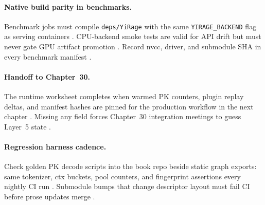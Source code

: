 \paragraph{Native build parity in benchmarks.} Benchmark jobs must compile \texttt{deps/YiRage} with the same \texttt{YIRAGE\_BACKEND} flag as serving containers \citep{yirage2026,chen2020compilerbasedhardw,patel2025llminference,taxbreak2026,memoryfloor2026,kwon2023vllm,liu2024deepseekv3,nvidia2024cudagraphs,dao2022flashattention,amd2024xdna,amd2024aie,dao2023flashdecoding,nvidia2022hopper,semianalysis2024tma,dlbook}. CPU-backend smoke tests are valid for API drift but must never gate GPU artifact promotion \citep{yirage2026,chen2020compilerbasedhardw,patel2025llminference,amd2024aie,amd2024xdna,taxbreak2026,memoryfloor2026,kwon2023vllm,liu2024deepseekv3,nvidia2024cudagraphs,dao2022flashattention,dao2023flashdecoding,nvidia2022hopper,semianalysis2024tma,dlbook}. Record nvcc, driver, and submodule SHA in every benchmark manifest \citep{yirage2026,chen2020compilerbasedhardw,patel2025llminference,dlbook,taxbreak2026,memoryfloor2026,kwon2023vllm,liu2024deepseekv3,nvidia2024cudagraphs,dao2022flashattention,amd2024aie,amd2024xdna,dao2023flashdecoding,nvidia2022hopper,semianalysis2024tma,dlbook}.

\paragraph{Handoff to Chapter~30.} The runtime worksheet completes when warmed PK counters, plugin replay deltas, and manifest hashes are pinned for the production workflow in the next chapter \citep{yirage2026,chen2020compilerbasedhardw,patel2025llminference,kwon2023vllm,taxbreak2026,memoryfloor2026,liu2024deepseekv3,nvidia2024cudagraphs,dao2022flashattention,amd2024xdna,amd2024aie,dao2023flashdecoding,nvidia2022hopper,semianalysis2024tma,dlbook}. Missing any field forces Chapter~30 integration meetings to guess Layer~5 state \citep{patel2025llminference,yirage2026,chen2020compilerbasedhardw,kwon2023vllm,memoryfloor2026,taxbreak2026,liu2024deepseekv3,nvidia2024cudagraphs,dao2022flashattention,amd2024aie,amd2024xdna,dao2023flashdecoding,nvidia2022hopper,semianalysis2024tma,dlbook}.


\paragraph{Regression harness cadence.} Check golden PK decode scripts into the book repo beside static graph exports: same tokenizer, ctx buckets, pool counters, and fingerprint assertions every nightly CI run \citep{yirage2026,chen2020compilerbasedhardw,patel2025llminference,taxbreak2026,memoryfloor2026,kwon2023vllm,liu2024deepseekv3,nvidia2024cudagraphs,dao2022flashattention,amd2024xdna,amd2024aie,dao2023flashdecoding,nvidia2022hopper,semianalysis2024tma,dlbook}. Submodule bumps that change descriptor layout must fail CI before prose updates merge \citep{yirage2026,chen2020compilerbasedhardw,patel2025llminference,dlbook,taxbreak2026,memoryfloor2026,kwon2023vllm,liu2024deepseekv3,nvidia2024cudagraphs,dao2022flashattention,amd2024aie,amd2024xdna,dao2023flashdecoding,nvidia2022hopper,semianalysis2024tma,dlbook}.


